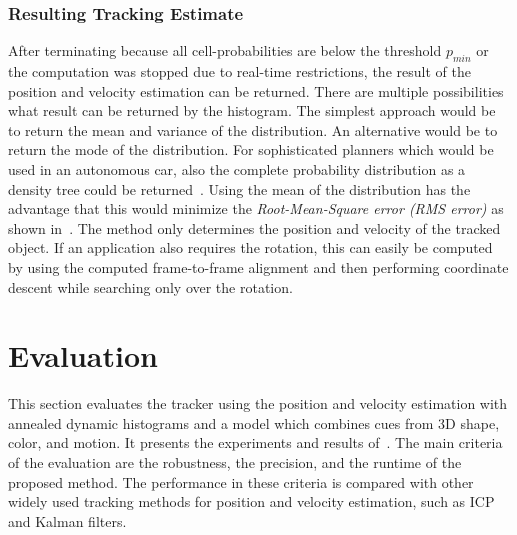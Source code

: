\documentclass[twoside,a4paper,article]{combine}
\begin{document}
\subsubsection{Resulting Tracking Estimate}
\label{sub:adh-resulting}
After terminating because all cell-probabilities are below the
threshold $p_{min}$ or the computation was stopped due to real-time
restrictions, the result of the position and velocity estimation can
be returned. There are multiple possibilities what result can be
returned by the histogram. The simplest approach would be to return
the mean and variance of the distribution. An alternative would be to
return the mode of the distribution. For sophisticated planners which
would be used in an autonomous car, also the complete probability
distribution as a density tree could be returned~\cite{density-tree}.
Using the mean of the distribution has the advantage that this would
minimize the \textit{Root-Mean-Square error (RMS error)} as shown
in~\cite{paper}. The method only determines the position and velocity
of the tracked object. If an application also requires the rotation,
this can easily be computed by using the computed frame-to-frame
alignment and then performing coordinate descent while searching only
over the rotation.

\section{Evaluation}
\label{sec:evaluation}
This section evaluates the tracker using the position and velocity
estimation with annealed dynamic histograms and a model which combines
cues from 3D shape, color, and motion. It presents the experiments and
results of~\cite{paper}. The main criteria of the evaluation are the
robustness, the precision, and the runtime of the proposed
method. The performance in these criteria is compared with other
widely used tracking methods for position and velocity estimation,
such as ICP and Kalman filters.
\end{document}
